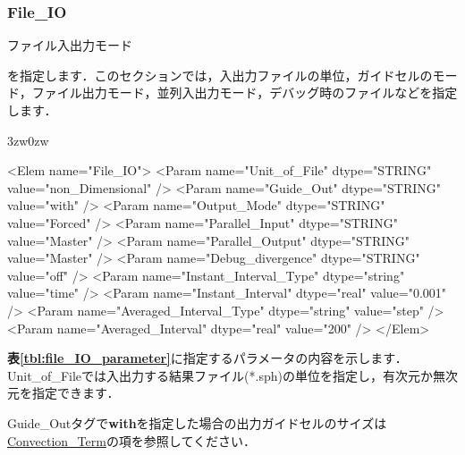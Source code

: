 \pagebreak
\subsubsection{File\_IO}

\hypertarget{tgt:fileio}{ファイル入出力モード}を指定します．このセクションでは，入出力ファイルの単位，ガイドセルのモード，ファイル出力モード，並列入出力モード，デバッグ時のファイルなどを指定します．

\begin{indentation}{3zw}{0zw}

{\small
\begin{program}
<Elem name="File_IO">
  <Param name="Unit_of_File"            dtype="STRING" value="non_Dimensional" />
  <Param name="Guide_Out"               dtype="STRING" value="with" />
  <Param name="Output_Mode"             dtype="STRING" value="Forced" />
  <Param name="Parallel_Input"          dtype="STRING" value="Master" />
  <Param name="Parallel_Output"         dtype="STRING" value="Master" />
  <Param name="Debug_divergence"        dtype="STRING" value="off" />
  <Param name="Instant_Interval_Type"   dtype="string" value="time" />
  <Param name="Instant_Interval"        dtype="real"   value="0.001" />
  <Param name="Averaged_Interval_Type"  dtype="string" value="step" />
  <Param name="Averaged_Interval"       dtype="real"   value="200" />
</Elem>
\end{program}
}

\textbf{表\ref{tbl:file_IO_parameter}}に指定するパラメータの内容を示します．
Unit\_of\_Fileでは入出力する結果ファイル(*.sph)の単位を指定し，有次元か無次元を指定できます．

Guide\_Outタグで\textbf{with}を指定した場合の出力ガイドセルのサイズは\hyperlink{tgt:convection_term}{Convection\_Term}の項を参照してください．



\end{indentation}
